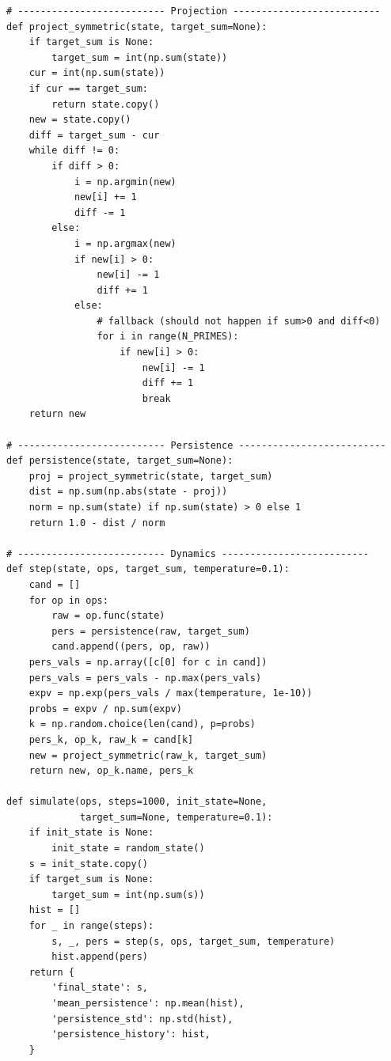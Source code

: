 \documentclass[11pt]{article}
\begin{document}
\begin{lstlisting}
# -------------------------- Projection --------------------------
def project_symmetric(state, target_sum=None):
    if target_sum is None:
        target_sum = int(np.sum(state))
    cur = int(np.sum(state))
    if cur == target_sum:
        return state.copy()
    new = state.copy()
    diff = target_sum - cur
    while diff != 0:
        if diff > 0:
            i = np.argmin(new)
            new[i] += 1
            diff -= 1
        else:
            i = np.argmax(new)
            if new[i] > 0:
                new[i] -= 1
                diff += 1
            else:
                # fallback (should not happen if sum>0 and diff<0)
                for i in range(N_PRIMES):
                    if new[i] > 0:
                        new[i] -= 1
                        diff += 1
                        break
    return new

# -------------------------- Persistence --------------------------
def persistence(state, target_sum=None):
    proj = project_symmetric(state, target_sum)
    dist = np.sum(np.abs(state - proj))
    norm = np.sum(state) if np.sum(state) > 0 else 1
    return 1.0 - dist / norm

# -------------------------- Dynamics --------------------------
def step(state, ops, target_sum, temperature=0.1):
    cand = []
    for op in ops:
        raw = op.func(state)
        pers = persistence(raw, target_sum)
        cand.append((pers, op, raw))
    pers_vals = np.array([c[0] for c in cand])
    pers_vals = pers_vals - np.max(pers_vals)
    expv = np.exp(pers_vals / max(temperature, 1e-10))
    probs = expv / np.sum(expv)
    k = np.random.choice(len(cand), p=probs)
    pers_k, op_k, raw_k = cand[k]
    new = project_symmetric(raw_k, target_sum)
    return new, op_k.name, pers_k

def simulate(ops, steps=1000, init_state=None,
             target_sum=None, temperature=0.1):
    if init_state is None:
        init_state = random_state()
    s = init_state.copy()
    if target_sum is None:
        target_sum = int(np.sum(s))
    hist = []
    for _ in range(steps):
        s, _, pers = step(s, ops, target_sum, temperature)
        hist.append(pers)
    return {
        'final_state': s,
        'mean_persistence': np.mean(hist),
        'persistence_std': np.std(hist),
        'persistence_history': hist,
    }


\end{lstlisting}
\end{document}

